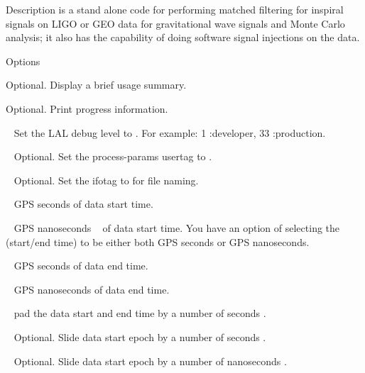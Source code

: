 \begin{entry}
\item[Description] 
 is a stand alone code for performing matched filtering for inspiral signals on LIGO 
or GEO data for gravitational wave signals and Monte Carlo analysis; it also has the capability of doing software signal injections on the data. 

\item[Options]\leavevmode
\begin{entry}
\item[\option{--help}] Optional. Display a brief usage summary.

\item[\option{--verbose}] Optional. Print progress information.

\item[\option{--debug-level}~\parm{LEVEL}] Set the LAL debug level to 
. For example: 1 :developer, 33 :production.

\item[\option{user-tag}~\parm{STRING}] Optional. Set the process-params 
usertag to .

\item[\option{--ifo-tag}~\parm{STRING}] Optional. Set the ifotag to 
 for file naming.

\item[\option{--gps-start-time}~\parm{SEC}] GPS seconds  of data 
start time.

\item[\option{--gps-start-time-ns}~\parm{NS}] GPS nanoseconds ~ of 
data start time. You have an option of selecting the (start/end time) to be either both 
GPS seconds or GPS nanoseconds.

\item[\option{--gps-end-time}~\parm{SEC}] GPS seconds  of data end 
time.

\item[\option{--gps-end-time-ns}~\parm{NS}] GPS nanoseconds  
of data end time.

\item[\option{--pad-data}~\parm{SEC}] pad the data start and end time 
by a number of seconds .

\item[\option{--slide-time}~\parm{SEC}] Optional. Slide data start epoch by 
a number of seconds .

\item[\option{--slide-time-ns}~\parm{NS}] Optional. Slide data start epoch 
by a number of nanoseconds .


\end{entry}
\end{entry}
